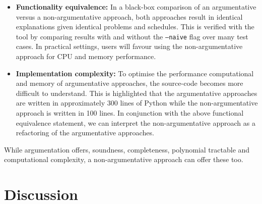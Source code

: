 \begin{itemize}
	\item\textbf{Functionality equivalence:} In a black-box comparison of an argumentative versus a non-argumentative approach, both approaches result in identical explanations given identical problems and schedules. This is verified with the tool by comparing results with and without the \texttt{--naive} flag over many test cases. In practical settings, users will favour using the non-argumentative approach for CPU and memory performance.
	\item\textbf{Implementation complexity: }To optimise the performance computational and memory of argumentative approaches, the source-code becomes more difficult to understand. This is highlighted that the argumentative approaches are written in approximately 300 lines of Python while the non-argumentative approach is written in 100 lines. In conjunction with the above functional equivalence statement, we can interpret the non-argumentative approach as a refactoring of the argumentative approaches.
\end{itemize}

While argumentation offers, soundness, completeness, polynomial tractable and computational complexity, a non-argumentative approach can offer these too.

\section{Discussion}

